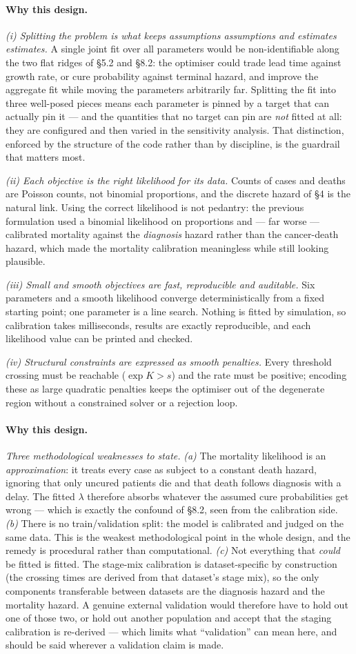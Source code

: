\documentclass[12pt,a4paper]{article}
\newcommand{\why}[1]{\paragraph{Why this design.} #1}
\begin{document}
\why{\emph{(i) Splitting the problem is what keeps assumptions assumptions and estimates estimates.} A
single joint fit over all parameters would be non-identifiable along the two flat ridges of \S5.2 and \S8.2:
the optimiser could trade lead time against growth rate, or cure probability against terminal hazard, and
improve the aggregate fit while moving the parameters arbitrarily far. Splitting the fit into three
well-posed pieces means each parameter is pinned by a target that can actually pin it --- and the quantities
that no target can pin are \emph{not} fitted at all: they are configured and then varied in the sensitivity
analysis. That distinction, enforced by the structure of the code rather than by discipline, is the
guardrail that matters most.

\emph{(ii) Each objective is the right likelihood for its data.} Counts of cases and deaths are Poisson
counts, not binomial proportions, and the discrete hazard of \S4 is the natural link. Using the correct
likelihood is not pedantry: the previous formulation used a binomial likelihood on proportions and --- far
worse --- calibrated mortality against the \emph{diagnosis} hazard rather than the cancer-death hazard, which
made the mortality calibration meaningless while still looking plausible.

\emph{(iii) Small and smooth objectives are fast, reproducible and auditable.} Six parameters and a smooth
likelihood converge deterministically from a fixed starting point; one parameter is a line search. Nothing is
fitted by simulation, so calibration takes milliseconds, results are exactly reproducible, and each
likelihood value can be printed and checked.

\emph{(iv) Structural constraints are expressed as smooth penalties.} Every threshold crossing must be
reachable ($\exp K > s$) and the rate must be positive; encoding these as large quadratic penalties keeps the
optimiser out of the degenerate region without a constrained solver or a rejection loop.}

\why{\emph{Three methodological weaknesses to state.}
\emph{(a)} The mortality likelihood is an \emph{approximation}: it treats every case as subject to a constant
death hazard, ignoring that only uncured patients die and that death follows diagnosis with a delay. The
fitted $\lambda$ therefore absorbs whatever the assumed cure probabilities get wrong --- which is exactly the
confound of \S8.2, seen from the calibration side.
\emph{(b)} There is no train/validation split: the model is calibrated and judged on the same data. This is
the weakest methodological point in the whole design, and the remedy is procedural rather than
computational.
\emph{(c)} Not everything that \emph{could} be fitted is fitted. The stage-mix calibration is
dataset-specific by construction (the crossing times are derived from that dataset's stage mix), so the only
components transferable between datasets are the diagnosis hazard and the mortality hazard. A genuine
external validation would therefore have to hold out one of those two, or hold out another population and
accept that the staging calibration is re-derived --- which limits what ``validation'' can mean here, and
should be said wherever a validation claim is made.}
\end{document}

